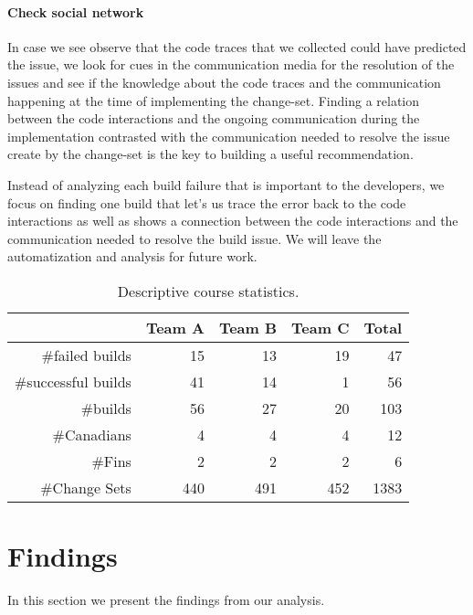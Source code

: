 \paragraph{Check social network}
In case we see observe that the code traces that we collected could have predicted the issue, we look for cues in the communication media for the resolution of the issues and see if the knowledge about the code traces and the communication happening at the time of implementing the change-set.
Finding a relation between the code interactions and the ongoing communication during the implementation contrasted with the communication needed to resolve the issue create by the change-set is the key to building a useful recommendation.

Instead of analyzing each build failure that is important to the developers, we focus on finding one build that let's us trace the error back to the code interactions as well as shows a connection between the code interactions and the communication needed to resolve the build issue.
We will leave the automatization and analysis for future work.

\begin{table}[t]
\centering
\begin{tabular}{rrrrr}
\toprule
& Team A & Team B & Team C & Total\\
\midrule
\#failed builds &15&13&19&47\\
\#successful builds &41&14&1&56\\ 
\#builds & 56 & 27 & 20 & 103 \\
\#Canadians & 4 & 4 & 4 & 12\\
\#Fins & 2 & 2 & 2 & 6\\
\#Change Sets & 440 & 491 &  452& 1383\\
\bottomrule
\end{tabular}
\caption{Descriptive course statistics.}
\end{table}


\section{Findings}
In this section we present the findings from our analysis.

